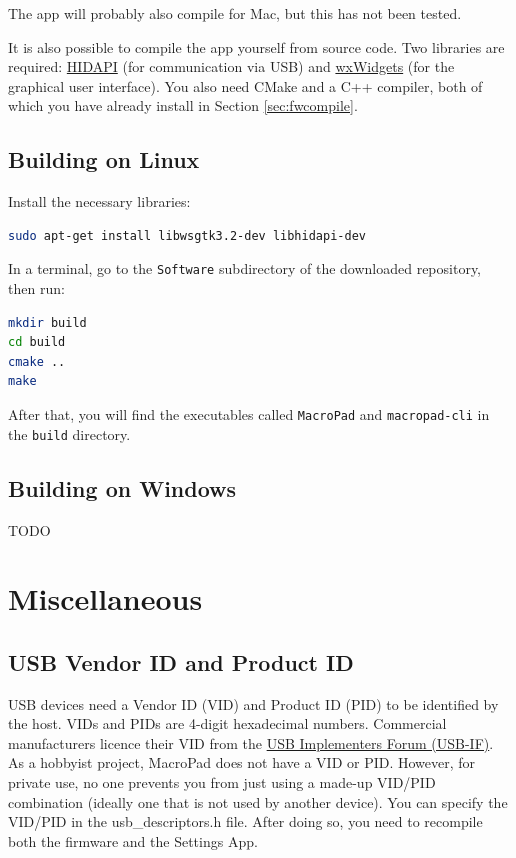 \documentclass{article}
\newenvironment{note}{\begin{tcolorbox}[colback=blue!5!white,colframe=blue!75!black,title=\textbf{Note}]}{\end{tcolorbox}}
\newcommand{\file}[1]{\texttt{#1}}
\begin{document}
\begin{note}
The app will probably also compile for Mac, but this has not been tested.
\end{note}

It is also possible to compile the app yourself from source code. Two libraries are required: \href{https://github.com/libusb/hidapi}{HIDAPI} (for communication via USB) and \href{https://www.wxwidgets.org/}{wxWidgets} (for the graphical user interface). You also need CMake and a C++ compiler, both of which you have already install in Section \ref{sec:fwcompile}. 

\subsection{Building on Linux}
Install the necessary libraries:
\begin{lstlisting}[language=bash]
sudo apt-get install libwsgtk3.2-dev libhidapi-dev
\end{lstlisting}

In a terminal, go to the \file{Software} subdirectory of the downloaded repository, then run: 
\begin{lstlisting}[language=bash]
mkdir build
cd build
cmake ..
make
\end{lstlisting}

After that, you will find the executables called \file{MacroPad} and \file{macropad-cli} in the \file{build} directory. 

\subsection{Building on Windows}
TODO

\section{Miscellaneous}
\subsection{USB Vendor ID and Product ID}
USB devices need a Vendor ID (VID) and Product ID (PID) to be identified by the host. VIDs and PIDs are 4-digit hexadecimal numbers. Commercial manufacturers licence their VID from the \href{https://www.usb.org/getting-vendor-id}{USB Implementers Forum (USB-IF)}.
As a hobbyist project, MacroPad does not have a VID or PID. However, for private use, no one prevents you from just using a made-up VID/PID combination (ideally one that is not used by another device).
You can specify the VID/PID in the usb\_descriptors.h file. After doing so, you need to recompile both the firmware and the Settings App.
\end{document}
